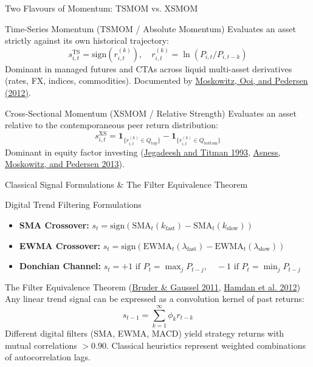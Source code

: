\documentclass[10pt]{beamer}
\begin{document}
\begin{frame}{Two Flavours of Momentum: TSMOM vs. XSMOM}
  \begin{block}{Time-Series Momentum (TSMOM / Absolute Momentum)}
    Evaluates an asset strictly against its own historical trajectory:
    \begin{equation*}
      s_{i,t}^{\text{TS}} = \text{sign}\left(r_{i,t}^{(k)}\right), \quad r_{i,t}^{(k)} = \ln\left(P_{i,t}/P_{i,t-k}\right)
    \end{equation*}
    Dominant in managed futures and CTAs across liquid multi-asset derivatives (rates, FX, indices, commodities). Documented by \href{https://doi.org/10.1016/j.jfineco.2011.11.003}{Moskowitz, Ooi, and Pedersen (2012)}.
  \end{block}
  \begin{block}{Cross-Sectional Momentum (XSMOM / Relative Strength)}
    Evaluates an asset relative to the contemporaneous peer return distribution:
    \begin{equation*}
      s_{i,t}^{\text{XS}} = \mathbf{1}_{\{r_{i,t}^{(k)} \in Q_{\text{top}}\}} - \mathbf{1}_{\{r_{i,t}^{(k)} \in Q_{\text{bottom}}\}}
    \end{equation*}
    Dominant in equity factor investing (\href{https://doi.org/10.1111/j.1540-6261.1993.tb04702.x}{Jegadeesh and Titman 1993}, \href{https://doi.org/10.1111/jofi.12021}{Asness, Moskowitz, and Pedersen 2013}).
  \end{block}
\end{frame}

\begin{frame}{Classical Signal Formulations \& The Filter Equivalence Theorem}
  \begin{block}{Digital Trend Filtering Formulations}
    \begin{itemize}\scriptsize
      \item \textbf{SMA Crossover:} $s_t = \text{sign}\left(\text{SMA}_t(k_{\text{fast}}) - \text{SMA}_t(k_{\text{slow}})\right)$
      \item \textbf{EWMA Crossover:} $s_t = \text{sign}\left(\text{EWMA}_t(\lambda_{\text{fast}}) - \text{EWMA}_t(\lambda_{\text{slow}})\right)$
      \item \textbf{Donchian Channel:} $s_t = +1 \text{ if } P_t = \max_{j} P_{t-j}, \quad -1 \text{ if } P_t = \min_{j} P_{t-j}$
    \end{itemize}
  \end{block}
  \begin{block}{The Filter Equivalence Theorem (\href{https://ssrn.com/abstract=2465623}{Bruder \& Gaussel 2011}, \href{http://www.thierry-roncalli.com/download/Alternative_Risk_Premia.pdf}{Hamdan et al. 2012})}
    Any linear trend signal can be expressed as a convolution kernel of past returns:
    \begin{equation*}
      s_{t-1} = \sum_{k=1}^\infty \phi_k r_{t-k}
    \end{equation*}
    Different digital filters (SMA, EWMA, MACD) yield strategy returns with mutual correlations $>0.90$. Classical heuristics represent weighted combinations of autocorrelation lags.
  \end{block}
\end{frame}
\end{document}
